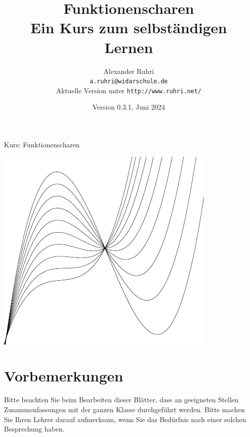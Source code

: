 \documentclass[11pt,a4paper,twoside,fleqn]{article}
\begin{document}
\renewcommand{\thepage}{Seite~\arabic{page}}
\renewcommand{\baselinestretch}{1.2}

\renewcommand{\labelenumi}{{\bf\arabic{enumi}.)}}
\renewcommand{\labelenumii}{{\bf\alph{enumii})}}
\renewcommand{\labelenumiii}{{\bf\roman{enumiii})}}

\renewcommand{\thecolumn}{{\bf\alph{column}\ }}
\newcommand{\labelcolumn}{{\bf\alph{column})\ \ \ }}
\setlength{\itemsep}{0pt}
\setlength{\mathindent}{0cm}





\pagestyle{myheadings}
%
{Kurs: Funktionenscharen\hfill}
\title{Funktionenscharen\\\large{Ein Kurs
    zum selbständigen Lernen}}
\author{Alexander Ruhri\\
  \small\texttt{a.ruhri@widarschule.de}\\
  \small Aktuelle Version unter \texttt{http://www.ruhri.net/}
}
\date{\small Version 0.3.1, Juni 2024}

\maketitle

{\centering\includegraphics[width=.6\linewidth]{pics/graph_title}

}

\section*{Vorbemerkungen}
Bitte beachten Sie beim Bearbeiten dieser Blätter, dass an geeigneten
Stellen Zusammenfassungen mit der ganzen Klasse durchgeführt
werden. Bitte machen Sie Ihren Lehrer darauf aufmerksam, wenn Sie das
Bedürfnis nach einer solchen Besprechung haben. 
\end{document}
